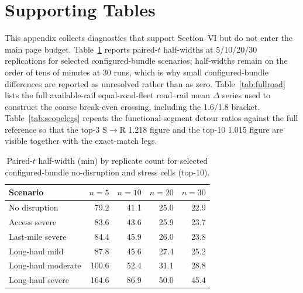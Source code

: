 \documentclass{ieeeaccess}
\begin{document}
\appendices

\section{Supporting Tables}
\label{app:tables}
This appendix collects diagnostics that support Section~VI but do not enter the main page budget. Table~\ref{tab:replicate} reports paired-$t$ half-widths at 5/10/20/30 replications for selected configured-bundle scenarios; half-widths remain on the order of tens of minutes at 30 runs, which is why small configured-bundle differences are reported as unresolved rather than as zero. Table~\ref{tab:fullroad} lists the full available-rail equal-road-fleet road--rail mean $\Delta$ series used to construct the coarse break-even crossing, including the 1.6/1.8 bracket. Table~\ref{tab:scopelegs} repeats the functional-segment detour ratios against the full reference so that the top-3 S$\rightarrow$R 1.218 figure and the top-10 1.015 figure are visible together with the exact-match legs.

\begin{table}[!t]
\caption{Paired-$t$ half-width (min) by replicate count for selected configured-bundle no-disruption and stress cells (top-10).}
\label{tab:replicate}
\centering
\footnotesize
\begin{tabular}{@{}lrrrr@{}}
\hline
Scenario & $n{=}5$ & $n{=}10$ & $n{=}20$ & $n{=}30$ \\
\hline
No disruption & 79.2 & 41.1 & 25.0 & 22.9 \\
Access severe & 83.6 & 43.6 & 25.9 & 23.7 \\
Last-mile severe & 84.4 & 45.9 & 26.0 & 23.8 \\
Long-haul mild & 87.8 & 45.6 & 27.4 & 25.2 \\
Long-haul moderate & 100.6 & 52.4 & 31.1 & 28.8 \\
Long-haul severe & 164.6 & 86.9 & 50.0 & 45.4 \\
\hline
\end{tabular}
\end{table}
\end{document}
